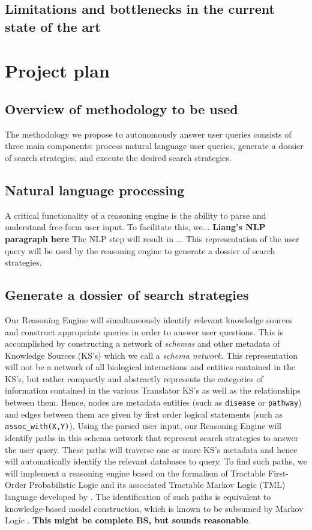 \documentclass[11pt,notitlepage]{article}
\begin{document}
\subsection{Limitations and bottlenecks in the current state of the art}

\section{Project plan}
\subsection{Overview of methodology to be used}
The methodology we propose to autonomously answer user queries consists of three main components: process natural language user queries, generate a dossier of search strategies, and execute the desired search strategies.
\subsection{Natural language processing}
\label{section:NLP}
A critical functionality of a reasoning engine is the ability to parse and understand free-form user input. To facilitate this, we...
\textbf{Liang's NLP paragraph here}
The NLP step will result in ... This representation of the user query will be used by the reasoning engine to generate a dossier of search strategies. 
\subsection{Generate a dossier of search strategies}
\label{section:strategies}
Our Reasoning Engine will simultaneously identify relevant knowledge sources and construct appropriate queries in order to answer user questions. This is accomplished by constructing a network of \textit{schemas} and other metadata of Knowledge Sources (KS's) which we call a \textit{schema network}. This representation will not be a network of all biological interactions and entities contained in the KS's, but rather compactly and abstractly represents the categories of information contained in the various Translator KS's as well as the relationships between them. Hence, nodes are metadata entities (such as \verb|disease| or \verb|pathway|) and edges between them are given by first order logical statements (such as \verb|assoc_with(X,Y)|). Using the parsed user input, our Reasoning Engine will identify paths in this schema network that represent search strategies to answer the user query. These paths will traverse one or more KS's metadata and hence will automatically identify the relevant databases to query. To find such paths, we will implement a reasoning engine based on the formalism of Tractable First-Order Probabilistic Logic and its associated Tractable Markov Logic (TML) language developed by \citet{Domingos:2012wi}. The identification of such paths is equivalent to knowledge-based model construction, which is known to be subsumed by Markov Logic \cite{domingos20071}. \textbf{This might be complete BS, but sounds reasonable}.
\end{document}
